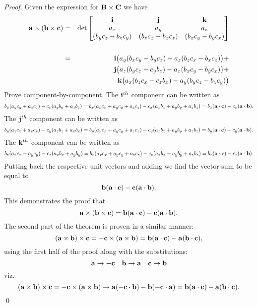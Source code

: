 \begin{proof}
Given the expression for ${\bf B} \times {\bf C}$ we have 
\begin{eqnarray*}
{\bf a} \times ({\bf b} \times {\bf c}) &=& 
\det\begin{bmatrix}
{\bf i} & {\bf j} & {\bf k}\\
a_x & a_y & a_z  \\
(b_yc_z - b_zc_y)&(b_zc_x - b_xc_z)  &  (b_xc_y-b_yc_x)\\
\end{bmatrix} \\ \\
&=& {\bf i} \big( a_y(b_xc_y-b_yc_x) - a_z(b_zc_x - b_xc_z) \big) + \\  
&\null & {\bf j} \big( a_z(b_yc_z - c_yb_z) - a_x(b_xc_y-b_yc_x) \big) + \\  
&\null & {\bf k} \big( a_x(b_zc_x - c_zb_x) - a_y(b_yc_z-b_zc_y) \big) \\  
\end{eqnarray*}
Prove component-by-component\cite{Spiegel}. The ${\bf i}^{th}$ component can be written as 
$$ b_x (a_yc_y + a_zc_z) - c_x(a_yb_y + a_zb_z)  = b_x (a_xc_x + a_yc_y + a_zc_z) - c_x(a_xb_x +a_yb_y + a_zb_z) = b_x( {\bf a}\cdot{\bf c}) - c_x({\bf a}\cdot{\bf b}).$$  
The ${\bf j}^{th}$ component can be written as 
$$ b_y (a_zc_z + a_xc_x) - c_y(a_zb_z + a_xb_x)  = b_y (a_xc_x + a_yc_y + a_zc_z) - c_y(a_xb_x +a_yb_y + a_zb_z) = b_y( {\bf a}\cdot{\bf c}) - c_y({\bf a}\cdot{\bf b}).$$  
The ${\bf k}^{th}$ component can be written as 
$$ b_z (a_xc_x + a_yc_y) - c_z(a_xb_x + a_yb_y)  = b_z (a_xc_x + a_yc_y + a_zc_z) - c_z(a_xb_x +a_yb_y + a_zb_z) = b_z( {\bf a}\cdot{\bf c}) - c_z({\bf a}\cdot{\bf b}).$$  
Putting back the respective unit vectors and adding we find the vector sum to be equal to
\[ {\bf b}({\bf a}\cdot {\bf c}) - {\bf c}({\bf a}\cdot {\bf b}).\] This demonstrates the proof that 
\[ {\bf a} \times ({\bf b} \times {\bf c}) = {\bf b}({\bf a}\cdot {\bf c}) - {\bf c}({\bf a}\cdot {\bf b}).\]
The second part of the theorem is proven in a similar manner:
\[ ({\bf a} \times {\bf b}) \times {\bf c}  = - {\bf c} \times ({\bf a} \times {\bf b}) = {\bf b}({\bf a}\cdot {\bf c}) - {\bf a}({\bf b}\cdot {\bf c}), \] using the first half of the proof along with the substitutions:
\[ {\bf a} \rightarrow -{\bf c}\quad {\bf b} \rightarrow {\bf a}\quad {\bf c} \rightarrow {\bf b}\] viz.
\[ ({\bf a} \times {\bf b}) \times {\bf c}  = -{\bf c} \times ({\bf a} \times {\bf b})  \rightarrow {\bf a} (-{\bf c}\cdot{\bf b}) - {\bf b} (-{\bf c}\cdot{\bf a}) = {\bf b}({\bf a}\cdot{\bf c}) -{\bf a}({\bf b}\cdot{\bf c}).\]\qed
\end{proof}

